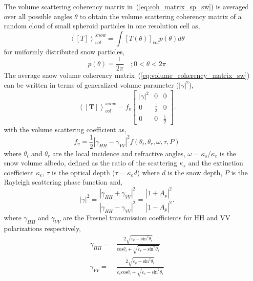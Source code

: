 The volume scattering coherency matrix in~(\ref{eq:coh_matrix_sp_sw}) is averaged over all possible angles $\theta$ to obtain the volume scattering coherency matrix of a random cloud of small spheroid particles in one resolution cell as,
\begin{equation}
\left\langle[T]\right\rangle_{vol}^{snow}=\int[T(\theta)]_{vol}p(\theta)d\theta
\label{eq:average_coherency_matrix_sw}
\end{equation}
for uniformly distributed snow particles, 
\begin{equation}
p(\theta)=\frac{1}{2\pi} \quad; 0<\theta<2\pi
\label{eq:uniform_distrbn_sw}
\end{equation}
The average snow volume coherency matrix~(\ref{eq:volume_coherency_matrix_sw}) can be written in terms of generalized volume parameter ($|\gamma|^2$), 
\begin{equation}
\left\langle\mathbf{[T]}\right\rangle_{vol}^{snow} = f_{v}\left[ \begin{array}{ccc}
|\gamma|^{2} & 0 & 0 \\
0 & \frac{1}{2} & 0 \\
0 & 0 & \frac{1}{2}
\end{array}\right].
\label{eq:volume_coherency_matrix_sw}
\end{equation}
with the volume scattering coefficient as,
\begin{equation}
f_{v} = \frac{1}{2}|\gamma_{HH}-\gamma_{VV}|^{2}f(\theta_{i},\theta_{r},\omega,\tau,P)
\label{eq:fv_sw}
\end{equation}
where $\theta_{i}$ and $\theta_{r}$ are the local incidence and refractive angles, $\omega=\kappa_{s}/\kappa_{e}$ is the snow volume albedo, defined as the ratio of the scattering $\kappa_{s}$ and the extinction coefficient $\kappa_{e}$, $\tau$ is the optical depth ($\tau=\kappa_{e}d$) where $d$ is the snow depth, $P$ is the Rayleigh scattering phase function and,
\begin{equation}
|\gamma|^2 = \frac{|\gamma_{HH} + \gamma_{VV}|^2}{|\gamma_{HH} - \gamma_{VV}|^2} = \frac{|1 + A_{p}|^2}{|1 - A_{p}|^2}.
\label{eq:gammasquare_sw}
\end{equation}
where $\gamma_{HH}$ and $\gamma_{VV}$ are the Fresnel transmission coefficients for HH and VV polarizations respectively,
\begin{subequations}
	\begin{align}
	\gamma_{HH} =& \frac{2\sqrt{\varepsilon_{v} - \mbox{sin}^2\theta_{i}}}{\mbox{cos}\theta_{i} + \sqrt{\varepsilon_{v} - \mbox{sin}^2\theta_{i}}} \\
	\gamma_{VV} =& \frac{2\sqrt{\varepsilon_{v} - \mbox{sin}^2\theta_{i}}}{\varepsilon_{v}\mbox{cos}\theta_{i} + \sqrt{\varepsilon_{v} - \mbox{sin}^2\theta_{i}}}
	\end{align}
	\label{eq:fresnel_trans_coefficients_sw}
\end{subequations}
